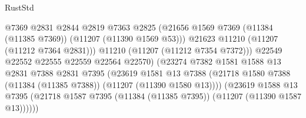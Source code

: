 \begin{lexlean}{RustStd}
\begin{coremodule}
                                              @7369
                                              @2831
                                              @2844
                                              @2819
                                              @7363
                                              @2825
                                              (@21656
                                                @1569
                                                @7369
                                                (@11384 (@11385 @7369))
                                                (@11207 (@11390 @1569 @53)))
                                              @21623
                                              @11210
                                              (@11207 (@11212 @7364 @2831)))
                                            @11210
                                            (@11207 (@11212 @7354 @7372)))
                                          @22549
                                          @22552
                                          @22555
                                          @22559
                                          @22564
                                          @22570)
                                        (@23274
                                          @7382
                                          @1581
                                          @1588
                                          @13
                                          @2831
                                          @7388
                                          @2831
                                          @7395
                                          (@23619
                                            @1581
                                            @13
                                            @7388
                                            (@21718
                                              @1580
                                              @7388
                                              (@11384 (@11385 @7388))
                                              (@11207 (@11390 @1580 @13))))
                                          (@23619
                                            @1588
                                            @13
                                            @7395
                                            (@21718
                                              @1587
                                              @7395
                                              (@11384 (@11385 @7395))
                                              (@11207 (@11390 @1587 @13))))))

\end{coremodule}
\end{lexlean}
